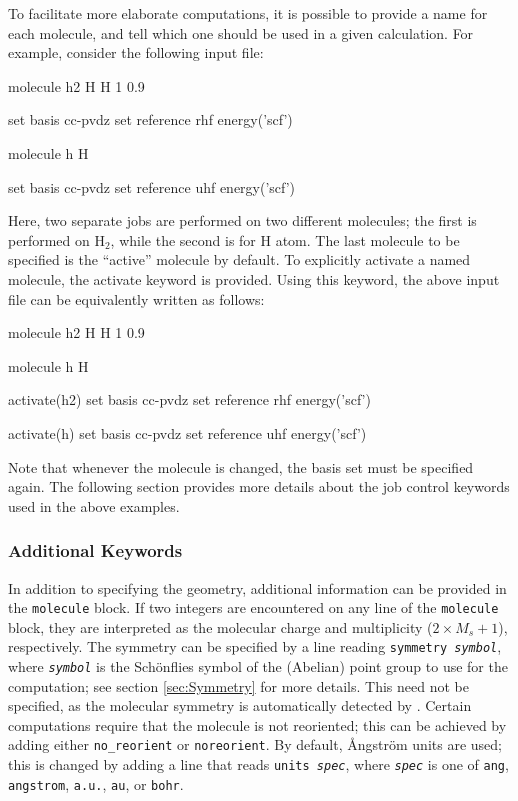 To facilitate more elaborate computations, it is possible to provide a name for
each molecule, and tell \PSIfour which one should be used in a given
calculation. For example, consider the following input file:
\begin{Snippet}
molecule h2{
  H
  H 1 0.9
}


set basis cc-pvdz
set reference rhf
energy('scf')

molecule h{
  H
}

set basis cc-pvdz
set reference uhf
energy('scf')
\end{Snippet}
Here, two separate jobs are performed on two different molecules; the first is
performed on H$_2$, while the second is for H atom. The last molecule to be
specified is the ``active'' molecule by default. To explicitly activate a named
molecule, the activate keyword is provided. Using this keyword, the above input
file can be equivalently written as follows:
\begin{Snippet}
molecule h2{
  H
  H 1 0.9
}

molecule h{
  H
}

activate(h2)
set basis cc-pvdz
set reference rhf
energy('scf')

activate(h)
set basis cc-pvdz
set reference uhf
energy('scf')
\end{Snippet}
Note that whenever the molecule is changed, the basis set must be specified
again. The following section provides more details about the job control
keywords used in the above examples.

\subsubsection{Additional Keywords}

In addition to specifying the geometry, additional information can be provided
in the {\tt molecule} block. If two integers are encountered on any line of the
{\tt molecule} block, they are interpreted as the molecular charge and multiplicity
($2\times M_s + 1$), respectively.  The symmetry can be specified by a line reading 
\texttt{symmetry \slshape symbol}, where \texttt{\slshape symbol} is
the Sch\"onflies symbol of the (Abelian) point group to use for the
computation; see section \ref{sec:Symmetry} for more details. This need not be
specified, as the molecular symmetry is automatically detected by \PSIfour.
Certain computations require that the molecule is not reoriented; this can be
achieved by adding either {\tt no\_reorient} or {\tt noreorient}. By default,
\AA ngstr\"om units are used; this is changed by adding a line that reads
\texttt{units \slshape spec}, where \texttt{\slshape spec} is one of {\tt ang},
{\tt angstrom}, {\tt a.u.}, {\tt au}, or {\tt bohr}.

